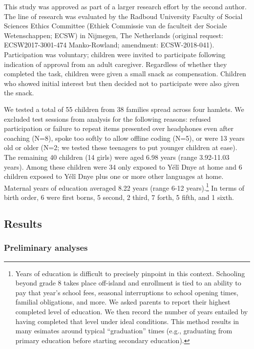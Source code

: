 \documentclass[english,,man,floatsintext]{apa6}
\begin{document}
This study was approved as part of a larger research effort by the second author. The line of research was evaluated by the Radboud University Faculty of Social Sciences Ethics Committee (Ethiek Commissie van de faculteit der Sociale Wetenschappen; ECSW) in Nijmegen, The Netherlands (original request: ECSW2017-3001-474 Manko-Rowland; amendment: ECSW-2018-041). Participation was voluntary; children were invited to participate following indication of approval from an adult caregiver. Regardless of whether they completed the task, children were given a small snack as compensation. Children who showed initial interest but then decided not to participate were also given the snack.

We tested a total of 55 children from 38 families spread across four hamlets. We excluded test sessions from analysis for the following reasons: refused participation or failure to repeat items presented over headphones even after coaching (N=8), spoke too softly to allow offline coding (N=5), or were 13 years old or older (N=2; we tested these teenagers to put younger children at ease). The remaining 40 children (14 girls) were aged 6.98 years (range 3.92-11.03 years). Among these children were 34 only exposed to Yélî Dnye at home and 6 children exposed to Yélî Dnye plus one or more other languages at home. Maternal years of education averaged 8.22 years (range 6-12 years).\footnote{Years of education is difficult to precisely pinpoint in this context. Schooling beyond grade 8 takes place off-island and enrollment is tied to an ability to pay that year's school fees, seasonal interruptions to school opening times, familial obligations, and more. We asked parents to report their highest completed level of education. We then record the number of years entailed by having completed that level under ideal conditions. This method results in many esimates around typical \enquote{graduation} times (e.g., graduating from primary education before starting secondary education).} In terms of birth order, 6 were first borns, 5 second, 2 third, 7 forth, 5 fifth, and 1 sixth.

\hypertarget{results}{%
\subsection{Results}\label{results}}

\hypertarget{preliminary-analyses}{%
\subsubsection{Preliminary analyses}\label{preliminary-analyses}}
\end{document}
